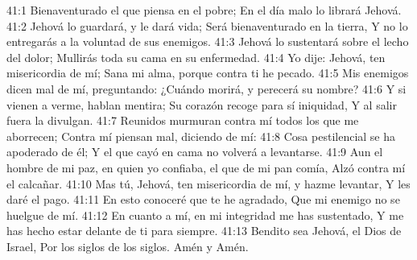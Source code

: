 41:1 Bienaventurado el que piensa en el pobre; 
En el día malo lo librará Jehová. 
41:2 Jehová lo guardará, y le dará vida; 
Será bienaventurado en la tierra, 
Y no lo entregarás a la voluntad de sus enemigos. 
41:3 Jehová lo sustentará sobre el lecho del dolor; 
Mullirás toda su cama en su enfermedad. 
41:4 Yo dije: Jehová, ten misericordia de mí; 
Sana mi alma, porque contra ti he pecado. 
41:5 Mis enemigos dicen mal de mí, preguntando: 
¿Cuándo morirá, y perecerá su nombre? 
41:6 Y si vienen a verme, hablan mentira; 
Su corazón recoge para sí iniquidad, 
Y al salir fuera la divulgan. 
41:7 Reunidos murmuran contra mí todos los que me aborrecen; 
Contra mí piensan mal, diciendo de mí: 
41:8 Cosa pestilencial se ha apoderado de él; 
Y el que cayó en cama no volverá a levantarse. 
41:9 Aun el hombre de mi paz, en quien yo confiaba, el que de mi pan comía, 
Alzó contra mí el calcañar. 
41:10 Mas tú, Jehová, ten misericordia de mí, y hazme levantar, 
Y les daré el pago. 
41:11 En esto conoceré que te he agradado, 
Que mi enemigo no se huelgue de mí. 
41:12 En cuanto a mí, en mi integridad me has sustentado, 
Y me has hecho estar delante de ti para siempre. 
41:13 Bendito sea Jehová, el Dios de Israel, 
Por los siglos de los siglos. 
Amén y Amén.
